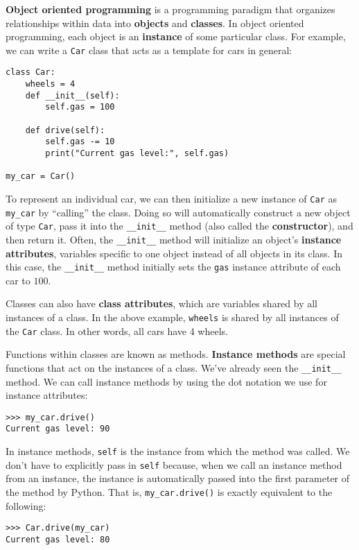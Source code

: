 \textbf{Object oriented programming} is a programming paradigm that organizes relationships within data into \textbf{objects} and \textbf{classes}. In object oriented programming, each object is an \textbf{instance} of some particular class. For example, we can write a \lstinline{Car} class that acts as a template for cars in general: 

\begin{lstlisting}
class Car:
    wheels = 4
    def __init__(self):
        self.gas = 100

    def drive(self):
        self.gas -= 10
        print("Current gas level:", self.gas)

my_car = Car()
\end{lstlisting}

To represent an individual car, we can then initialize a new instance of \lstinline{Car} as \lstinline{my_car} by ``calling'' the class. Doing so will automatically construct a new object of type \lstinline{Car}, pass it into the \lstinline{__init__} method (also called the \textbf{constructor}), and then return it. Often, the \lstinline{__init__} method will initialize an object's \textbf{instance attributes}, variables specific to one object instead of all objects in its class. In this case, the \lstinline{__init__} method initially sets the \lstinline{gas} instance attribute of each car to $100$. 

Classes can also have \textbf{class attributes}, which are variables shared by all instances of a class. In the above example, \lstinline{wheels} is shared by all instances of the \lstinline{Car} class. In other words, all cars have 4 wheels. 

Functions within classes are known as methods. \textbf{Instance methods} are special functions that act on the instances of a class. We've already seen the \lstinline{__init__} method. We can call instance methods by using the dot notation we use for instance attributes: 
\begin{lstlisting}
>>> my_car.drive()
Current gas level: 90
\end{lstlisting}
In instance methods, \lstinline{self} is the instance from which the method was called.  We don’t have to explicitly pass in \lstinline{self} because, when we call an instance method from an instance, the instance is automatically passed into the first parameter of the method by Python. That is, \lstinline{my_car.drive()} is exactly equivalent to the following: 
\begin{lstlisting}
>>> Car.drive(my_car)
Current gas level: 80
\end{lstlisting}


